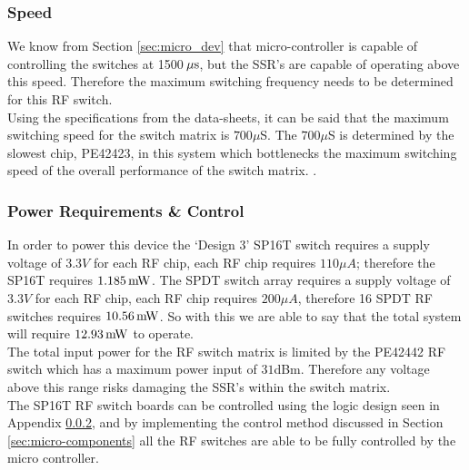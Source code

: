 \documentclass[12pt,openany,a4paper]{book}
\newcommand{\Pack}	{\hspace{-0.12em}}
\newcommand{\us}	{\ensuremath{\rm\,\mu s}}
\newcommand{\mW}	{\ensuremath{\rm\,m\Pack W}}
\begin{document}





\subsubsection{Speed}
We know from Section \ref{sec:micro_dev} that micro-controller is capable of controlling the switches at 1500\us , but the SSR's are capable of operating above this speed. Therefore the maximum switching frequency needs to be determined for this RF switch. \\
Using the specifications from the data-sheets, it can be said that the maximum switching speed for the switch matrix is $700\mu$S. The $700\mu$S is determined by the slowest chip, PE42423, in this system which bottlenecks the maximum switching speed of the overall performance of the switch matrix. . 


\subsubsection{Power Requirements \& Control}
In order to power this device the `Design 3' SP16T switch requires a supply voltage of $3.3V$ for each RF chip, each RF chip requires $110\mu A$; therefore the SP16T requires $1.185\mW$. The SPDT switch array requires a supply voltage of $3.3V$ for each RF chip, each RF chip requires $200\mu A$, therefore 16 SPDT RF switches requires $10.56\mW$. So with this we are able to say that the total system will require $12.93\mW$ to operate.\\[0.2cm]
The total input power for the RF switch matrix is limited by the PE42442 RF switch which has a maximum power input of $31$dBm. Therefore any voltage above this range risks damaging the SSR's within the switch matrix.\\[0.3cm]
The SP16T RF switch boards can be controlled using the logic design seen in Appendix \ref{}, and by implementing the control method discussed in Section \ref{sec:micro-components} all the RF switches are able to be fully controlled by the micro controller.
\end{document}
